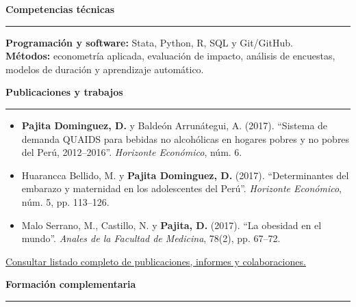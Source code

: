 \documentclass[11pt,a4paper]{article}
\newcommand{\seccion}[1]{%
  \vspace{8pt}
  \begin{center}\textbf{#1}\end{center}
  \vspace{-5pt}\hrule\vspace{7pt}
}
\begin{document}

\seccion{Competencias técnicas}

\textbf{Programación y software:}
Stata, Python, R, SQL y Git/GitHub.\\
\textbf{Métodos:}
econometría aplicada, evaluación de impacto, análisis de encuestas, modelos de duración y aprendizaje automático.



\seccion{Publicaciones y trabajos}

\begin{itemize}[
  leftmargin=1.1em,
  itemsep=3pt,
  topsep=0pt
]

  \item \textbf{Pajita Dominguez, D.} y Baldeón Arrunátegui, A. (2017).
  ``Sistema de demanda QUAIDS para bebidas no alcohólicas en hogares pobres y no pobres del Perú, 2012--2016''.
  \textit{Horizonte Económico}, núm. 6.

  \item Huarancca Bellido, M. y \textbf{Pajita Dominguez, D.} (2017).
  ``Determinantes del embarazo y maternidad en los adolescentes del Perú''.
  \textit{Horizonte Económico}, núm. 5, pp. 113--126.

  \item Malo Serrano, M., Castillo, N. y \textbf{Pajita, D.} (2017).
  ``La obesidad en el mundo''.
  \textit{Anales de la Facultad de Medicina}, 78(2), pp. 67--72.

\end{itemize}

\vspace{3pt}

\href{https://danielpajita.github.io/publicaciones/}
{\underline{Consultar listado completo de publicaciones, informes y colaboraciones.}}


\seccion{Formación complementaria}
\end{document}
